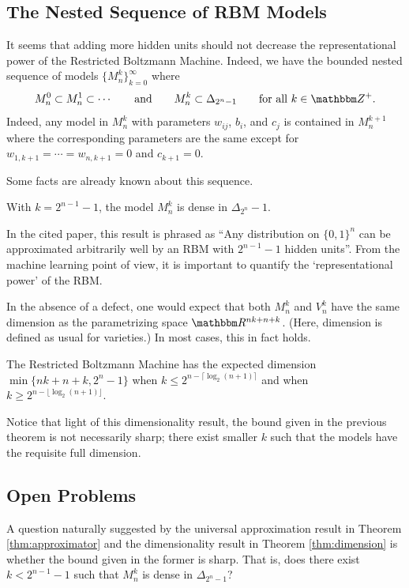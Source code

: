 \documentclass[11pt,titlepage]{article}
\numberwithin{equation}{section}
\begin{document}
\subsection{The Nested Sequence of RBM Models}

    It seems that adding more hidden units should not decrease the
    representational power of the Restricted Boltzmann Machine.  Indeed, we have
    the bounded nested sequence of models $\{M_n^k\}_{k=0}^\infty$ where
    \[
        M_n^0 \subset M_n^1 \subset \cdots 
        \qquad\text{and}\qquad
        M_n^k \subset \Delta_{2^n-1}
        \qquad\text{for all $k \in \Z^+$}.
    \]
    Indeed, any model in $M_n^k$ with parameters $w_{ij}$, $b_i$, and $c_j$ is
    contained in $M_n^{k+1}$ where the corresponding parameters are the same
    except for $w_{1,k+1} = \cdots = w_{n, k+1} = 0$  and $c_{k+1} = 0$.

    Some facts are already known about this sequence.
    \begin{theorem}[\cite{MA10}] \label{thm:approximator}
    With $k = 2^{n-1} - 1$, the model $M_n^k$ is dense in $\Delta_{2^n} - 1$.
    \end{theorem}
    In the cited paper, this result is phrased as ``Any distribution on
    $\{0,1\}^n$ can be approximated arbitrarily well by an RBM with $2^{n-1} -
    1$ hidden units''.  From the machine learning point of view, it is important
    to quantify the `representational power' of the RBM.

    In the absence of a defect, one would expect that both $M_n^k$ and $V_n^k$
    have the same dimension as the parametrizing space $\R^{nk + n + k}$.
    (Here, dimension is defined as usual for varieties.) In most cases, this in
    fact holds.
    \begin{theorem} \label{thm:dimension}
    The Restricted Boltzmann Machine has the expected dimension
    $\min\{nk+n+k, 2^n-1\}$ when $k \le 2^{n-\lceil \log_2(n+1)\rceil}$ and
    when $k \ge 2^{n-\lfloor\log_2(n+1)\rfloor}$.
    \end{theorem}
    Notice that light of this dimensionality result, the bound given in the
    previous theorem is not necessarily sharp; there exist smaller $k$ such that
    the models have the requisite full dimension.

\subsection{Open Problems}

    A question naturally suggested by the universal approximation result in
    Theorem \ref{thm:approximator} and the dimensionality result in Theorem
    \ref{thm:dimension} is whether the bound given in the former is sharp.  That
    is, does there exist $k < 2^{n-1}-1$ such that $M_n^k$ is dense in
    $\Delta_{2^n-1}$?
\end{document}
